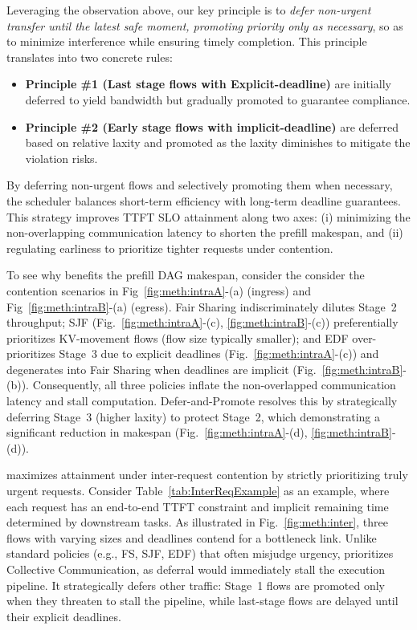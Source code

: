  Leveraging the observation above, our key principle is to \emph{defer non-urgent transfer until the latest safe moment, promoting priority only as necessary}, so as to minimize interference while ensuring timely completion. This principle translates into two concrete rules:
\begin{itemize}[leftmargin=*]
    \item \textbf{Principle \#1 (Last stage flows with Explicit-deadline)} are initially deferred to yield bandwidth but gradually promoted to guarantee compliance.
    \item \textbf{Principle \#2 (Early stage flows with implicit-deadline)} are deferred based on relative laxity and promoted as the laxity diminishes to mitigate the violation risks.
\end{itemize}

By deferring non-urgent flows and selectively promoting them when necessary, the scheduler balances short-term efficiency with long-term deadline guarantees.
This strategy improves TTFT SLO attainment along two axes:
(i) minimizing the non-overlapping communication latency to shorten the prefill makespan, and
(ii) regulating earliness to prioritize tighter requests under contention.

To see why \DAP benefits the prefill DAG makespan, consider the  consider the contention scenarios in Fig~\ref{fig:meth:intraA}-(a) (ingress) and Fig~\ref{fig:meth:intraB}-(a) (egress). Fair Sharing indiscriminately dilutes Stage~2 throughput; SJF (Fig.~\ref{fig:meth:intraA}-(c), \ref{fig:meth:intraB}-(c)) preferentially prioritizes KV-movement flows (flow size typically smaller); and EDF over-prioritizes Stage~3 due to explicit deadlines (Fig.~\ref{fig:meth:intraA}-(c)) and degenerates into Fair Sharing when deadlines are implicit (Fig.~\ref{fig:meth:intraB}-(b)). Consequently, all three policies inflate the non-overlapped communication latency and stall computation. Defer-and-Promote resolves this by strategically deferring Stage~3 (higher laxity) to protect Stage~2, which demonstrating a significant reduction in makespan (Fig.~\ref{fig:meth:intraA}-(d), \ref{fig:meth:intraB}-(d)).

\DAP maximizes attainment under inter-request contention by strictly prioritizing truly urgent requests. Consider Table~\ref{tab:InterReqExample} as an example, where each request has an end-to-end TTFT constraint and implicit remaining time determined by downstream tasks. As illustrated in Fig.~\ref{fig:meth:inter}, three flows with varying sizes and deadlines contend for a bottleneck link. Unlike standard policies (e.g., FS, SJF, EDF) that often misjudge urgency, \DAP prioritizes Collective Communication, as deferral would immediately stall the execution pipeline. It strategically defers other traffic: Stage~1 flows are promoted only when they threaten to stall the pipeline, while last-stage flows are delayed until their explicit deadlines.
